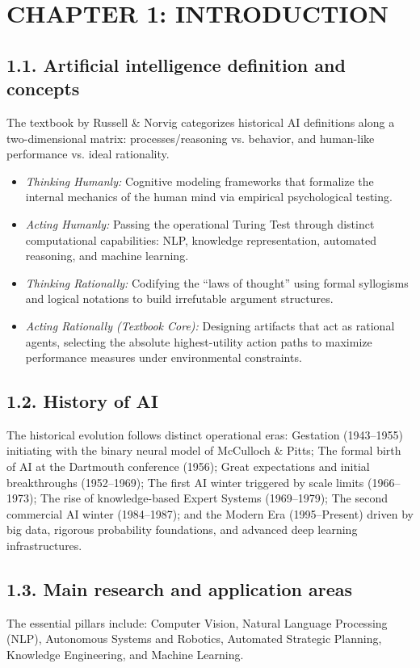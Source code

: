 \documentclass[../main.tex]{subfiles}
\begin{document}

\section{CHAPTER 1: INTRODUCTION}

\subsection{1.1. Artificial intelligence definition and concepts}
The textbook by Russell \& Norvig categorizes historical AI definitions along a two-dimensional matrix: processes/reasoning vs. behavior, and human-like performance vs. ideal rationality.
\begin{itemize}
    \item \textit{Thinking Humanly:} Cognitive modeling frameworks that formalize the internal mechanics of the human mind via empirical psychological testing.
    \item \textit{Acting Humanly:} Passing the operational Turing Test through distinct computational capabilities: NLP, knowledge representation, automated reasoning, and machine learning.
    \item \textit{Thinking Rationally:} Codifying the ``laws of thought'' using formal syllogisms and logical notations to build irrefutable argument structures.
    \item \textit{Acting Rationally (Textbook Core):} Designing artifacts that act as rational agents, selecting the absolute highest-utility action paths to maximize performance measures under environmental constraints.
\end{itemize}

\subsection{1.2. History of AI}
The historical evolution follows distinct operational eras: Gestation (1943--1955) initiating with the binary neural model of McCulloch \& Pitts; The formal birth of AI at the Dartmouth conference (1956); Great expectations and initial breakthroughs (1952--1969); The first AI winter triggered by scale limits (1966--1973); The rise of knowledge-based Expert Systems (1969--1979); The second commercial AI winter (1984--1987); and the Modern Era (1995--Present) driven by big data, rigorous probability foundations, and advanced deep learning infrastructures.

\subsection{1.3. Main research and application areas}
The essential pillars include: Computer Vision, Natural Language Processing (NLP), Autonomous Systems and Robotics, Automated Strategic Planning, Knowledge Engineering, and Machine Learning.
\end{document}
